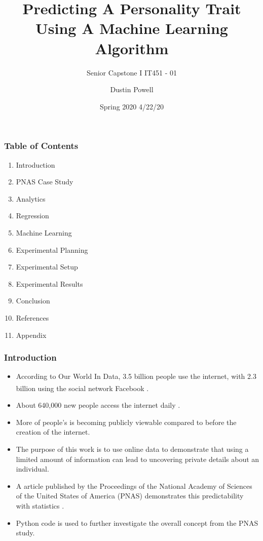 \documentclass{beamer}
\title{Predicting  A Personality Trait Using A Machine Learning Algorithm}
\subtitle{Senior Capstone I IT451 - 01}
\date{Spring 2020 4/22/20}
\author{Dustin Powell}
\institute{Cumberland University}
\begin{document}
\newtheorem{q1}{Primary Question}

 
\frame{\titlepage}

\begin{frame}
\frametitle{Table of Contents}
\begin{enumerate}
\item Introduction
\item PNAS Case Study
\item Analytics
\item Regression
\item Machine Learning
\item Experimental Planning
\item Experimental Setup
\item Experimental Results
\item Conclusion
\item References
\item Appendix
\end{enumerate}

\end{frame}

\begin{frame}
\frametitle{Introduction}
\footnotesize
\begin{itemize}
    \item According to Our World In Data, 3.5 billion people use the internet, with  2.3 billion using the social network Facebook\textsuperscript{\textregistered} \cite{IntStats}.
    \item About 640,000 new people access the internet daily \cite{IntStats}.
    \item More of people's  is becoming publicly viewable compared to before the creation of the internet.
    \item The purpose of this work is to use online data to demonstrate that using a limited amount of information can lead to uncovering private details about an individual. 
    \item A article published by the  Proceedings of the National Academy of Sciences of the United States of America (PNAS) demonstrates this predictability with statistics \cite{Kosinski2013}.
    \item Python code is used to further investigate the overall concept from the PNAS study.
\end{itemize}
\end{frame}
\end{document}

